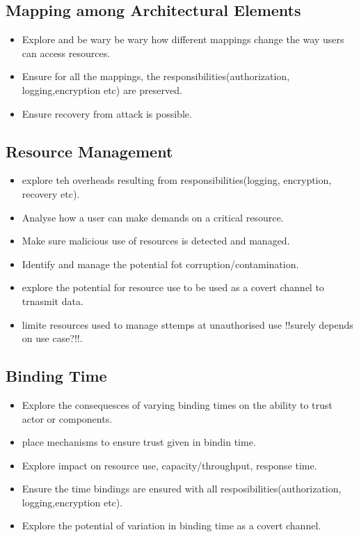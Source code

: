 \documentclass[a4paper]{report}
\begin{document}
\subsection{Mapping among Architectural Elements}
\begin{itemize}
\item Explore and be wary be wary how different mappings change the way users can access resources.
\item Ensure for all the mappings, the responsibilities(authorization, logging,encryption etc) are preserved.
\item Ensure recovery from attack is possible.
\end{itemize}
\subsection{Resource Management}
\begin{itemize}
\item explore teh overheads resulting from responsibilities(logging, encryption, recovery etc).
\item Analyse how a user can make demands on a critical resource.
\item Make sure malicious use of resources is detected and managed.
\item Identify and manage the potential fot corruption/contamination.
\item explore the potential for resource use to be used as a covert channel to trnasmit data.
\item limite resources used to manage sttemps at unauthorised use !!surely depends on use case?!!.
\end{itemize}
\subsection{Binding Time}
\begin{itemize}
\item Explore the consequesces of varying binding times on the ability to trust actor or components.
\item place mechanisms to ensure trust given in bindin time.
\item Explore impact on resource use, capacity/throughput, response time.
\item Ensure the time bindings are ensured with all resposibilities(authorization, logging,encryption etc).
\item Explore the potential of variation in binding time as a covert channel.
\end{itemize}
\end{document}
